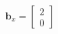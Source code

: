 \documentclass[preview]{standalone}
\begin{document}
\begin{align*}
\mathbf{b}_x = \begin{bmatrix} 2 \\ 0 \end{bmatrix}
\end{align*}
\end{document}
